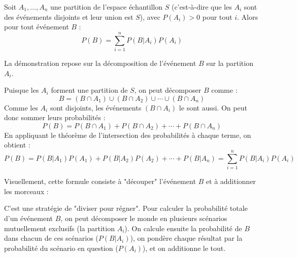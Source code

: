\begin{theorembox}
Soit $A_1, \dots, A_n$ une partition de l'espace échantillon $S$ (c'est-à-dire que les $A_i$ sont des événements disjoints et leur union est $S$), avec $P(A_i) > 0$ pour tout $i$. Alors pour tout événement $B$ :
$$P(B) = \sum_{i=1}^{n} P(B|A_i)P(A_i)$$
\end{theorembox}

La démonstration repose sur la décomposition de l'événement $B$ sur la partition $A_i$.

\begin{proofbox}
Puisque les $A_i$ forment une partition de $S$, on peut décomposer $B$ comme :
$$B = (B \cap A_1) \cup (B \cap A_2) \cup \cdots \cup (B \cap A_n)$$
Comme les $A_i$ sont disjoints, les événements $(B \cap A_i)$ le sont aussi. On peut donc sommer leurs probabilités :
$$P(B) = P(B \cap A_1) + P(B \cap A_2) + \cdots + P(B \cap A_n)$$
En appliquant le théorème de l'intersection des probabilités à chaque terme, on obtient :
$$P(B) = P(B|A_1)P(A_1) + P(B|A_2)P(A_2) + \cdots + P(B|A_n) = \sum_{i=1}^{n} P(B|A_i)P(A_i)$$
\end{proofbox}

Visuellement, cette formule consiste à "découper" l'événement $B$ et à additionner les morceaux :

\begin{intuitionbox}
C'est une stratégie de "diviser pour régner". Pour calculer la probabilité totale d'un événement $B$, on peut décomposer le monde en plusieurs scénarios mutuellement exclusifs (la partition $A_i$). On calcule ensuite la probabilité de $B$ dans chacun de ces scénarios ($P(B|A_i)$), on pondère chaque résultat par la probabilité du scénario en question ($P(A_i)$), et on additionne le tout.

\begin{center}
\end{center}
\end{intuitionbox}

